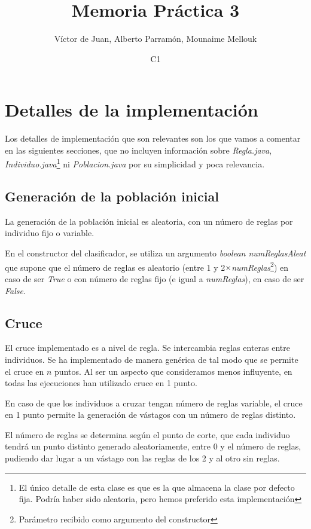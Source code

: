 \documentclass[nochap]{apuntes}
\title{Memoria Práctica 3}
\author{Víctor de Juan, Alberto Parramón, Mounaime Mellouk}
\date{C1}
\begin{document}
\pagestyle{plain}
\maketitle

\tableofcontents
\newpage

\chapter{Detalles de la implementación}
Los detalles de implementación que son relevantes son los que vamos a comentar en las siguientes secciones, que no incluyen información sobre \textit{Regla.java}, \textit{Individuo.java}\footnote{El único detalle de esta clase es que es la que almacena la clase por defecto fija. Podría haber sido aleatoria, pero hemos preferido esta implementación} ni \textit{Poblacion.java} por su simplicidad y poca relevancia.

\section{Generación de la población inicial}

La generación de la población inicial es aleatoria, con un número de reglas por individuo fijo o variable. 

En el constructor del clasificador, se utiliza un argumento \textit{boolean numReglasAleat} que supone que el número de reglas es aleatorio (entre 1 y 2$\times$\textit{numReglas}\footnote{Parámetro recibido como argumento del constructor}) en caso de ser \textit{True} o con número de reglas fijo (e igual a \textit{numReglas}), en caso de ser \textit{False}.


\section{Cruce}
El cruce implementado es a nivel de regla. Se intercambia reglas enteras entre individuos. Se ha implementado de manera genérica de tal modo que se permite el cruce en $n$ puntos. Al ser un aspecto que consideramos menos influyente, en todas las ejecuciones han utilizado cruce en 1 punto.

En caso de que los individuos a cruzar tengan número de reglas variable, el cruce en 1 punto permite la generación de vástagos con un número de reglas distinto.

El número de reglas se determina según el punto de corte, que cada individuo tendrá un punto distinto generado aleatoriamente, entre $0$ y el número de reglas, pudiendo dar lugar a un vástago con las reglas de los 2 y al otro sin reglas.
\end{document}
